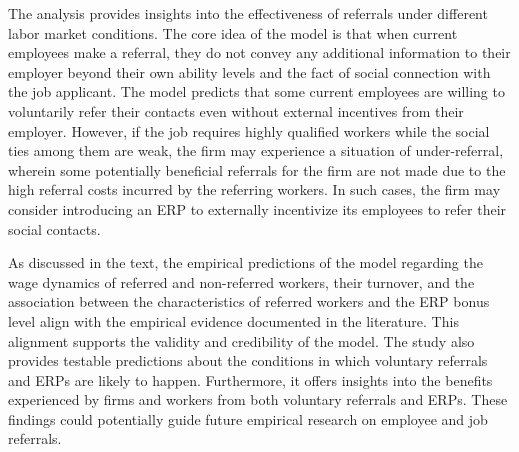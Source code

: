 \documentclass[12pt]{article}
\begin{document}
The analysis provides insights into the effectiveness of referrals under different labor market conditions. The core idea of the model is that when current employees make a referral, they do not convey any additional information to their employer beyond their own ability levels and the fact of social connection with the job applicant. The model predicts that some current employees are willing to voluntarily refer their contacts even without external incentives from their employer. However, if the job requires highly qualified workers while the social ties among them are weak, the firm may experience a situation of under-referral, wherein some potentially beneficial referrals for the firm are not made due to the high referral costs incurred by the referring workers. In such cases, the firm may consider introducing an ERP to externally incentivize its employees to refer their social contacts.

As discussed in the text, the empirical predictions of the model regarding the wage dynamics of referred and non-referred workers, their turnover, and the association between the characteristics of referred workers and the ERP bonus level align with the empirical evidence documented in the literature. This alignment supports the validity and credibility of the model. The study also provides testable predictions about the conditions in which voluntary referrals and ERPs are likely to happen. Furthermore, it offers insights into the benefits experienced by firms and workers from both voluntary referrals and ERPs. These findings could potentially guide future empirical research on employee and job referrals.

\singlespacing
\setlength\bibsep{0pt}





\clearpage

\onehalfspacing





\end{document}
